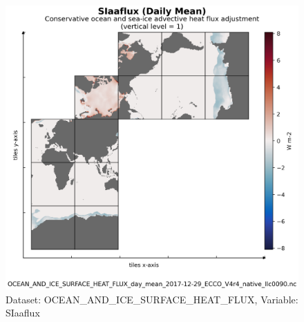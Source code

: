 \begin{figure}[H]
\centering
\includegraphics[scale=0.55]{../images/plots/v4r4/native_plots/Ocean_and_Sea-Ice_Surface_Heat_Fluxes/SIaaflux.png}
\caption{Dataset: OCEAN\_AND\_ICE\_SURFACE\_HEAT\_FLUX, Variable: SIaaflux}
\label{tab:table-OCEAN_AND_ICE_SURFACE_HEAT_FLUX_SIaaflux-Plot}
\end{figure}
\newpage
\pagebreak
